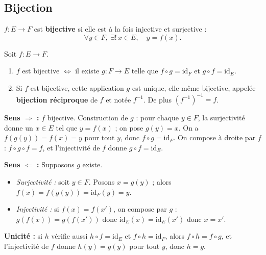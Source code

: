 \subsection{Bijection}

\begin{defbox}[--- Bijection]
$f : E \to F$ est \textbf{bijective} si elle est à la fois injective et surjective :
\[\forall y \in F,\; \exists!\, x \in E, \quad y = f(x).\]
\end{defbox}

\begin{propbox}
Soit $f : E \to F$.
\begin{enumerate}[leftmargin=1.5cm]
  \item $f$ est bijective $\iff$ il existe $g : F \to E$ telle que $f \circ g = \mathrm{id}_F$ et $g \circ f = \mathrm{id}_E$.
  \item Si $f$ est bijective, cette application $g$ est unique, elle-même bijective, appelée \textbf{bijection réciproque} de $f$ et notée $f^{-1}$. De plus $(f^{-1})^{-1} = f$.
\end{enumerate}
\end{propbox}

\begin{proofbox}
\textbf{Sens $\Rightarrow$ :} $f$ bijective. Construction de $g$ : pour chaque $y \in F$, la surjectivité donne un $x \in E$ tel que $y = f(x)$ ; on pose $g(y) = x$. On a $f(g(y)) = f(x) = y$ pour tout $y$, donc $f \circ g = \mathrm{id}_F$. On compose à droite par $f$ : $f \circ g \circ f = f$, et l'injectivité de $f$ donne $g \circ f = \mathrm{id}_E$.

\medskip
\textbf{Sens $\Leftarrow$ :} Supposons $g$ existe.
\begin{itemize}[leftmargin=1cm]
  \item \emph{Surjectivité :} soit $y \in F$. Posons $x = g(y)$ ; alors $f(x) = f(g(y)) = \mathrm{id}_F(y) = y$.
  \item \emph{Injectivité :} si $f(x) = f(x')$, on compose par $g$ : $g(f(x)) = g(f(x'))$ donc $\mathrm{id}_E(x) = \mathrm{id}_E(x')$ donc $x = x'$.
\end{itemize}

\medskip
\textbf{Unicité :} si $h$ vérifie aussi $h \circ f = \mathrm{id}_E$ et $f \circ h = \mathrm{id}_F$, alors $f \circ h = f \circ g$, et l'injectivité de $f$ donne $h(y) = g(y)$ pour tout $y$, donc $h = g$.
\end{proofbox}

